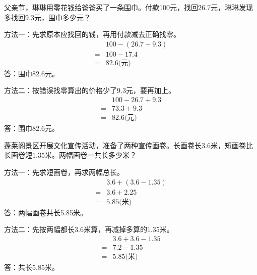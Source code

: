 父亲节，琳琳用零花钱给爸爸买了一条围巾。付款100元，找回\(26.7\)元，琳琳发现多找回\(9.3\)元，围巾多少元？\par
\begin{BookAnswer}
方法一：先求原本应找回的钱，再用付款减去正确找零。\[\begin{aligned}&100-(26.7-9.3)\\={}&100-17.4\\={}&82.6\text{(元)}\end{aligned}\]答：围巾82.6元。\par 方法二：按错误找零算出的价格少了9.3元，要再加上。\[\begin{aligned}&100-26.7+9.3\\={}&73.3+9.3\\={}&82.6\text{(元)}\end{aligned}\]答：围巾82.6元。
\end{BookAnswer}

蓬莱阁景区开展文化宣传活动，准备了两种宣传画卷。长画卷长\(3.6\)米，短画卷比长画卷短\(1.35\)米。两幅画卷一共长多少米？\par
\begin{BookAnswer}
方法一：先求短画卷，再求两幅总长。\[\begin{aligned}&3.6+(3.6-1.35)\\={}&3.6+2.25\\={}&5.85\text{(米)}\end{aligned}\]答：两幅画卷共长5.85米。\par 方法二：先按两幅都长3.6米算，再减掉多算的1.35米。\[\begin{aligned}&3.6+3.6-1.35\\={}&7.2-1.35\\={}&5.85\text{(米)}\end{aligned}\]答：共长5.85米。
\end{BookAnswer}

